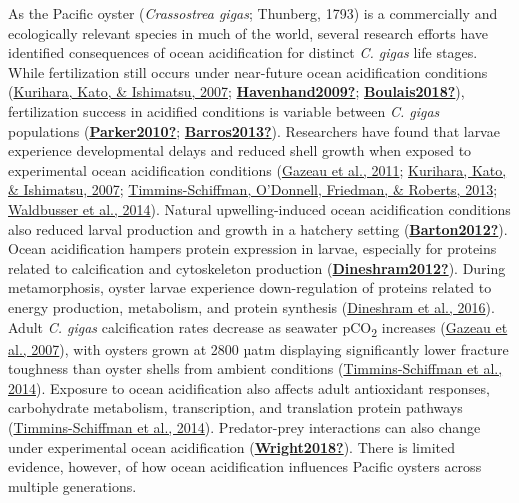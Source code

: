 \documentclass [11pt, proquest] {uwthesis}[2015/03/03]
\begin{document}
As the Pacific oyster (\emph{Crassostrea gigas}; Thunberg, 1793) is a commercially and ecologically relevant species in much of the world, several research efforts have identified consequences of ocean acidification for distinct \emph{C. gigas} life stages. While fertilization still occurs under near-future ocean acidification conditions (\protect\hyperlink{ref-Kurihara2007}{Kurihara, Kato, \& Ishimatsu, 2007}; \protect\hyperlink{ref-Havenhand2009}{\textbf{Havenhand2009?}}; \protect\hyperlink{ref-Boulais2018}{\textbf{Boulais2018?}}), fertilization success in acidified conditions is variable between \emph{C. gigas} populations (\protect\hyperlink{ref-Parker2010}{\textbf{Parker2010?}}; \protect\hyperlink{ref-Barros2013}{\textbf{Barros2013?}}). Researchers have found that larvae experience developmental delays and reduced shell growth when exposed to experimental ocean acidification conditions (\protect\hyperlink{ref-Gazeau2011}{Gazeau et al., 2011}; \protect\hyperlink{ref-Kurihara2007}{Kurihara, Kato, \& Ishimatsu, 2007}; \protect\hyperlink{ref-Timmins-Schiffman2013}{Timmins-Schiffman, O'Donnell, Friedman, \& Roberts, 2013}; \protect\hyperlink{ref-Waldbusser2014}{Waldbusser et al., 2014}). Natural upwelling-induced ocean acidification conditions also reduced larval production and growth in a hatchery setting (\protect\hyperlink{ref-Barton2012}{\textbf{Barton2012?}}). Ocean acidification hampers protein expression in larvae, especially for proteins related to calcification and cytoskeleton production (\protect\hyperlink{ref-Dineshram2012}{\textbf{Dineshram2012?}}). During metamorphosis, oyster larvae experience down-regulation of proteins related to energy production, metabolism, and protein synthesis (\protect\hyperlink{ref-Dineshram2016}{Dineshram et al., 2016}). Adult \emph{C. gigas} calcification rates decrease as seawater pCO\textsubscript{2} increases (\protect\hyperlink{ref-Gazeau2007}{Gazeau et al., 2007}), with oysters grown at 2800 µatm displaying significantly lower fracture toughness than oyster shells from ambient conditions (\protect\hyperlink{ref-Timmins-Schiffman2014}{Timmins-Schiffman et al., 2014}). Exposure to ocean acidification also affects adult antioxidant responses, carbohydrate metabolism, transcription, and translation protein pathways (\protect\hyperlink{ref-Timmins-Schiffman2014}{Timmins-Schiffman et al., 2014}). Predator-prey interactions can also change under experimental ocean acidification (\protect\hyperlink{ref-Wright2018}{\textbf{Wright2018?}}). There is limited evidence, however, of how ocean acidification influences Pacific oysters across multiple generations.
\end{document}
